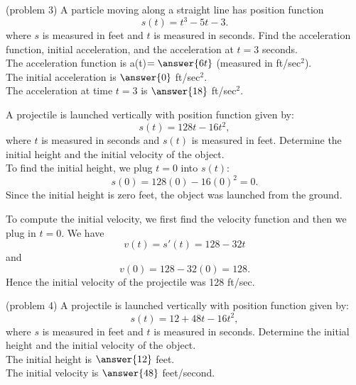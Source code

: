 \documentclass{ximera}
\begin{document}
\begin{problem}(problem 3)
A particle moving along a straight line has position function
\[s(t) = t^3 - 5t -3.\]
where $s$ is measured in feet and $t$ is measured in seconds.
Find the acceleration function, initial acceleration, and the acceleration at $t = 3$ seconds.\\

The acceleration function is a(t)$ = \answer{6t}$ (measured in ft/sec$^2$).\\
The initial acceleration is $\answer{0}$ ft/sec$^2$.\\
The acceleration at time $t=3$ is $\answer{18}$ ft/sec$^2$.


\end{problem}



\begin{example}[example 4]
A projectile is launched vertically with position function given by:
\[s(t) = 128t - 16t^2,\]
where $t$ is measured in seconds and $s(t)$ is measured in feet.
Determine the initial height and the initial velocity of the object.\\

To find the initial height, we plug $t = 0$ into $s(t)$:
\[s(0) = 128(0) - 16(0)^2 = 0.\]
Since the initial height is zero feet, the object was launched from the ground.

To compute the initial velocity, we first find the velocity function and then we plug in $t=0$.
We have
\[v(t) = s'(t) = 128 - 32t\]
and 
\[v(0) = 128 - 32(0) = 128.\]
Hence the initial velocity of the projectile was 128 ft/sec.

\end{example}


\begin{problem} (problem 4)
A projectile is launched vertically with position function given by:
\[s(t) = 12 + 48t - 16t^2,\]
where $s$ is measured in feet and $t$ is measured in seconds.
Determine the initial height and the initial velocity of the object.\\

The initial height is $\answer{12}$ feet.\\
The initial velocity is $\answer{48}$ feet/second.

\end{problem}
\end{document}
